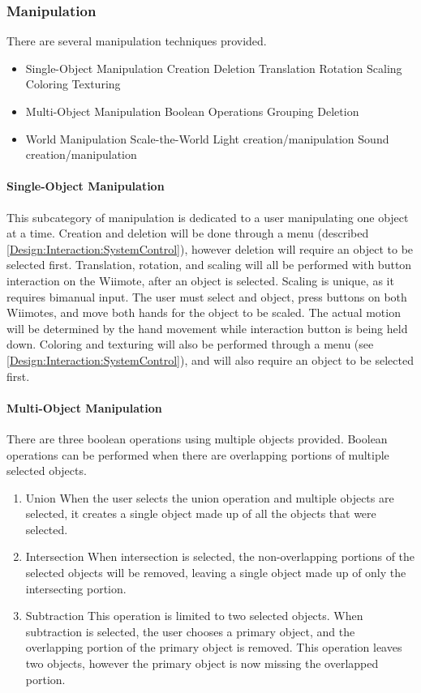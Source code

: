 \subsubsection{Manipulation}
\label{Design:Interaction:Manipulation}
There are several manipulation techniques provided.
\begin{itemize}
	\item Single-Object Manipulation
		\subitem Creation
		\subitem Deletion
		\subitem Translation
		\subitem Rotation
		\subitem Scaling
		\subitem Coloring
		\subitem Texturing
	\item Multi-Object Manipulation
		\subitem Boolean Operations
		\subitem Grouping
		\subitem Deletion
	\item World Manipulation
		\subitem Scale-the-World
		\subitem Light creation/manipulation
		\subitem Sound creation/manipulation
\end{itemize}

\paragraph{Single-Object Manipulation}
This subcategory of manipulation is dedicated to a user manipulating one object at a time.
Creation and deletion will be done through a menu (described \ref{Design:Interaction:SystemControl}), however deletion will require an object to be selected first.
Translation, rotation, and scaling will all be performed with button interaction on the Wiimote, after an object is selected.
Scaling is unique, as it requires bimanual input.
The user must select and object, press buttons on both Wiimotes, and move both hands for the object to be scaled.
The actual motion will be determined by the hand movement while interaction button is being held down.
Coloring and texturing will also be performed through a menu (see \ref{Design:Interaction:SystemControl}), and will also require an object to be selected first.

\paragraph{Multi-Object Manipulation}
There are three boolean operations using multiple objects provided.  Boolean operations can be performed when there are overlapping portions of multiple selected objects.
\begin{enumerate}
	\item Union
	\subitem When the user selects the union operation and multiple objects are selected, it creates a single object made up of all the objects that were selected.
	\item Intersection
	\subitem When intersection is selected, the non-overlapping portions of the selected objects will be removed, leaving a single object made up of only the intersecting portion.
	\item Subtraction
	\subitem This operation is limited to two selected objects.  When subtraction is selected, the user chooses a primary object, and the overlapping portion of the primary object is removed.  This operation leaves two objects, however the primary object is now missing the overlapped portion.
\end{enumerate}

